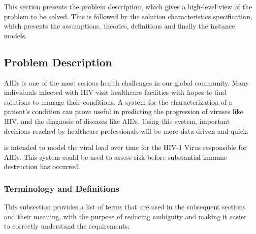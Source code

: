 \documentclass[12pt]{article}
\begin{document}
This section presents the problem description, which gives a 
high-level view of the problem to be solved.  This is followed by the solution 
characteristics specification, which presents the assumptions, theories, 
definitions and finally the instance models.


\subsection{Problem Description} \label{Sec_pd}

AIDs is one of the most serious health challenges in our global community. 
Many individuals infected with HIV visit healthcare facilities with hopes to 
find solutions to manage 
their conditions. A system for the characterization of a 
patient’s condition can prove useful in predicting the progression of viruses 
like HIV, and the diagnosis of diseases like AIDs. Using this system, important 
decisions reached by healthcare professionals will be more data-driven and 
quick.

\progname{} is intended to model the viral load over time for the HIV-1 Virus 
responsible for AIDs. This system could be used to assess risk before 
substantial immune destruction 
has occurred.



\subsubsection{Terminology and Definitions}


This subsection provides a list of terms that are used in the subsequent
sections and their meaning, with the purpose of reducing ambiguity and making it
easier to correctly understand the requirements:
\end{document}
